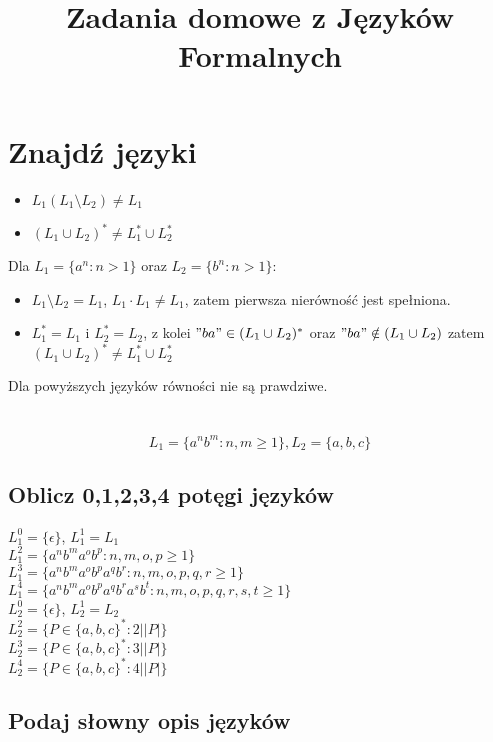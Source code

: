 \documentclass{../notatki}
\title{Zadania domowe z Języków Formalnych}
\begin{document}
\section{Znajdź języki}

\begin{itemize}
  \item $L_1(L_1 \setminus  L_2) \ne L_1 $
  \item $(L_1 \cup L_2)^* \ne L_1^* \cup L_2^*$
\end{itemize}

\divider
Dla $L_1 = \{a^n : n > 1\}$ oraz $L_2 = \{b^n : n > 1\}$:

\begin{itemize}
  \item $L_1 \setminus L_2 = L_1$, $L_1 \cdot L_1 \ne L_1$, zatem
    pierwsza nierówność jest spełniona.
  \item $L_1^* = L_1 $ i $L_2^* = L_2$, z kolei $"ba" \in (L_1 \cup
    L_2)^*$ oraz $"ba" \notin (L_1 \cup L_2)$ zatem $(L_1 \cup L_2)^*
    \ne L_1^* \cup L_2^*$
\end{itemize}
Dla powyższych języków równości nie są prawdziwe.

\section{}

$$
L_1 = \{a^nb^m : n,m \ge 1\}, L_2 = \{a, b, c\}
$$
\subsection{Oblicz 0,1,2,3,4 potęgi języków}
$L_1^0 = \{\epsilon\}$, $L_1^1 = L_1$\\
$L_1^2 = \{a^nb^ma^ob^p : n,m,o,p \ge 1\}$\\
$L_1^3 = \{a^nb^ma^ob^pa^qb^r : n,m,o,p,q,r \ge 1\}$\\
$L_1^4 = \{a^nb^ma^ob^pa^qb^ra^sb^t : n,m,o,p,q,r,s,t \ge 1\}$\\
$L_2^0 = \{\epsilon\}$, $L_2^1 = L_2$\\
$L_2^2 = \{P \in \{a,b,c\}^* : 2| |P|\}$\\
$L_2^3 = \{P \in \{a,b,c\}^* : 3| |P|\}$\\
$L_2^4 = \{P \in \{a,b,c\}^* : 4| |P|\}$\\

\subsection{Podaj słowny opis języków}
\end{document}
